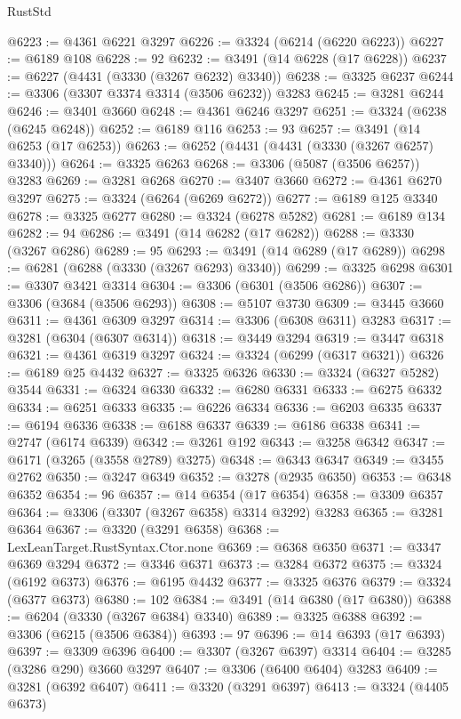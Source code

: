 \begin{lexlean}{RustStd}
\begin{coremodule}
@6223 := @4361 @6221 @3297
@6226 := @3324 (@6214 (@6220 @6223))
@6227 := @6189 @108
@6228 := 92
@6232 := @3491 (@14 @6228 (@17 @6228))
@6237 := @6227 (@4431 (@3330 (@3267 @6232) @3340))
@6238 := @3325 @6237
@6244 := @3306 (@3307 @3374 @3314 (@3506 @6232)) @3283
@6245 := @3281 @6244
@6246 := @3401 @3660
@6248 := @4361 @6246 @3297
@6251 := @3324 (@6238 (@6245 @6248))
@6252 := @6189 @116
@6253 := 93
@6257 := @3491 (@14 @6253 (@17 @6253))
@6263 := @6252 (@4431 (@4431 (@3330 (@3267 @6257) @3340)))
@6264 := @3325 @6263
@6268 := @3306 (@5087 (@3506 @6257)) @3283
@6269 := @3281 @6268
@6270 := @3407 @3660
@6272 := @4361 @6270 @3297
@6275 := @3324 (@6264 (@6269 @6272))
@6277 := @6189 @125 @3340
@6278 := @3325 @6277
@6280 := @3324 (@6278 @5282)
@6281 := @6189 @134
@6282 := 94
@6286 := @3491 (@14 @6282 (@17 @6282))
@6288 := @3330 (@3267 @6286)
@6289 := 95
@6293 := @3491 (@14 @6289 (@17 @6289))
@6298 := @6281 (@6288 (@3330 (@3267 @6293) @3340))
@6299 := @3325 @6298
@6301 := @3307 @3421 @3314
@6304 := @3306 (@6301 (@3506 @6286))
@6307 := @3306 (@3684 (@3506 @6293))
@6308 := @5107 @3730
@6309 := @3445 @3660
@6311 := @4361 @6309 @3297
@6314 := @3306 (@6308 @6311) @3283
@6317 := @3281 (@6304 (@6307 @6314))
@6318 := @3449 @3294
@6319 := @3447 @6318
@6321 := @4361 @6319 @3297
@6324 := @3324 (@6299 (@6317 @6321))
@6326 := @6189 @25 @4432
@6327 := @3325 @6326
@6330 := @3324 (@6327 @5282) @3544
@6331 := @6324 @6330
@6332 := @6280 @6331
@6333 := @6275 @6332
@6334 := @6251 @6333
@6335 := @6226 @6334
@6336 := @6203 @6335
@6337 := @6194 @6336
@6338 := @6188 @6337
@6339 := @6186 @6338
@6341 := @2747 (@6174 @6339)
@6342 := @3261 @192
@6343 := @3258 @6342
@6347 := @6171 (@3265 (@3558 @2789) @3275)
@6348 := @6343 @6347
@6349 := @3455 @2762
@6350 := @3247 @6349
@6352 := @3278 (@2935 @6350)
@6353 := @6348 @6352
@6354 := 96
@6357 := @14 @6354 (@17 @6354)
@6358 := @3309 @6357
@6364 := @3306 (@3307 (@3267 @6358) @3314 @3292) @3283
@6365 := @3281 @6364
@6367 := @3320 (@3291 @6358)
@6368 := LexLeanTarget.RustSyntax.Ctor.none
@6369 := @6368 @6350
@6371 := @3347 @6369 @3294
@6372 := @3346 @6371
@6373 := @3284 @6372
@6375 := @3324 (@6192 @6373)
@6376 := @6195 @4432
@6377 := @3325 @6376
@6379 := @3324 (@6377 @6373)
@6380 := 102
@6384 := @3491 (@14 @6380 (@17 @6380))
@6388 := @6204 (@3330 (@3267 @6384) @3340)
@6389 := @3325 @6388
@6392 := @3306 (@6215 (@3506 @6384))
@6393 := 97
@6396 := @14 @6393 (@17 @6393)
@6397 := @3309 @6396
@6400 := @3307 (@3267 @6397) @3314
@6404 := @3285 (@3286 @290) @3660 @3297
@6407 := @3306 (@6400 @6404) @3283
@6409 := @3281 (@6392 @6407)
@6411 := @3320 (@3291 @6397)
@6413 := @3324 (@4405 @6373)

\end{coremodule}
\end{lexlean}
